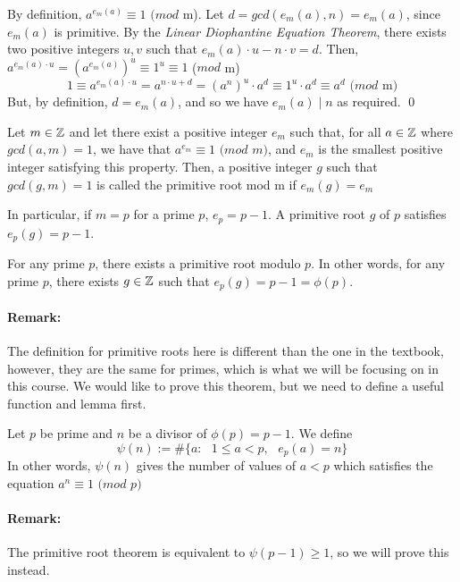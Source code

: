 \documentclass[../main.tex]{subfiles}
\begin{document}
\begin{pf}
    By definition, $a^{e_m(a)} \equiv 1$ $(mod$ m). Let $d = gcd(e_m(a), n)=e_m(a)$, since $e_m(a)$ is primitive. \sspace
    By the \textit{Linear Diophantine Equation Theorem}, there exists two positive integers $u,v$ such that $e_m(a)\cdot u - n \cdot v = d$. Then, $a^{e_m(a)\cdot u}=(a^{e_m(a)})^u \equiv 1^u \equiv 1$ ($mod$ m) $$1 \equiv a^{e_m(a)\cdot u} = a^{n\cdot u + d} = (a^n)^u \cdot a^d \equiv 1^u \cdot a^d \equiv a^d \text{ (}mod \text{ m)}$$
    But, by definition, $d=e_m(a)$, and so we have $e_m(a) \mid n$ as required. \qed
\end{pf}
\begin{defn}
    Let $m \in \mathbb{Z}$ and let there exist a positive integer $e_m$ such that, for all $a \in \mathbb{Z}$ where $gcd(a,m)=1$, we have that $a^{e_m} \equiv 1$ $(mod$ $m)$, and $e_m$ is the smallest positive integer satisfying this property. \sspace
    Then, a positive integer $g$ such that $gcd(g, m)=1$ is called the primitive root mod m if $e_m(g)=e_m$
\end{defn}
In particular, if $m=p$ for a prime $p$, $e_p=p-1$. A primitive root $g$ of $p$ satisfies $e_p(g)=p-1$.

\begin{thm}
    For any prime $p$, there exists a primitive root modulo $p$. In other words, for any prime $p$, there exists $g \in \mathbb{Z}$ such that $e_p(g)=p-1=\phi(p)$.
\end{thm}

\paragraph{Remark:} The definition for primitive roots here is different than the one in the textbook, however, they are the same for primes, which is what we will be focusing on in this course. \sspace
We would like to prove this theorem, but we need to define a useful function and lemma first.
\begin{defn}
    Let $p$ be prime and $n$ be a divisor of $\phi(p)=p-1$. We define $$\psi(n):=\#\{a:\text{ }1 \leq a < p,\text{ } e_p(a)=n\}$$In other words, $\psi(n)$ gives the number of values of $a < p$ which satisfies the equation $a^n \equiv 1$ $(mod$ $p)$
\end{defn}

\paragraph{Remark:} The primitive root theorem is equivalent to $\psi(p-1) \geq 1$, so we will prove this instead.
\end{document}
